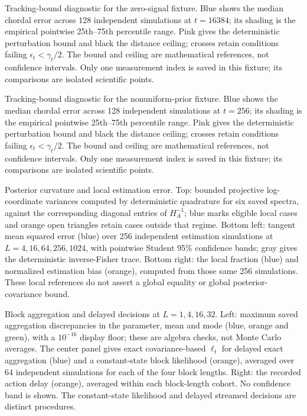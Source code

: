 \caption{Tracking-bound diagnostic for the zero-signal fixture. Blue shows the median chordal error across 128 independent simulations at $t=16384$; its shading is the empirical pointwise 25th--75th percentile range. Pink gives the deterministic perturbation bound and black the distance ceiling; crosses retain conditions failing $\epsilon_t<\gamma_t/2$. The bound and ceiling are mathematical references, not confidence intervals. Only one measurement index is saved in this fixture; its comparisons are isolated scientific points.}

\caption{Tracking-bound diagnostic for the nonuniform-prior fixture. Blue shows the median chordal error across 128 independent simulations at $t=256$; its shading is the empirical pointwise 25th--75th percentile range. Pink gives the deterministic perturbation bound and black the distance ceiling; crosses retain conditions failing $\epsilon_t<\gamma_t/2$. The bound and ceiling are mathematical references, not confidence intervals. Only one measurement index is saved in this fixture; its comparisons are isolated scientific points.}

\caption{Posterior curvature and local estimation error. Top: bounded projective log-coordinate variances computed by deterministic quadrature for six saved spectra, against the corresponding diagonal entries of $H_A^{-1}$; blue marks eligible local cases and orange open triangles retain cases outside that regime. Bottom left: tangent mean squared error (blue) over 256 independent estimation simulations at $L=4,16,64,256,1024$, with pointwise Student 95\% confidence bands; gray gives the deterministic inverse-Fisher trace. Bottom right: the local fraction (blue) and normalized estimation bias (orange), computed from those same 256 simulations. These local references do not assert a global equality or global posterior-covariance bound.}

\caption{Block aggregation and delayed decisions at $L=1,4,16,32$. Left: maximum saved aggregation discrepancies in the parameter, mean and mode (blue, orange and green), with a $10^{-16}$ display floor; these are algebra checks, not Monte Carlo averages. The center panel gives exact covariance-based $\ell_t$ for delayed exact aggregation (blue) and a constant-state block likelihood (orange), averaged over 64 independent simulations for each of the four block lengths. Right: the recorded action delay (orange), averaged within each block-length cohort. No confidence band is shown. The constant-state likelihood and delayed streamed decisions are distinct procedures.}

